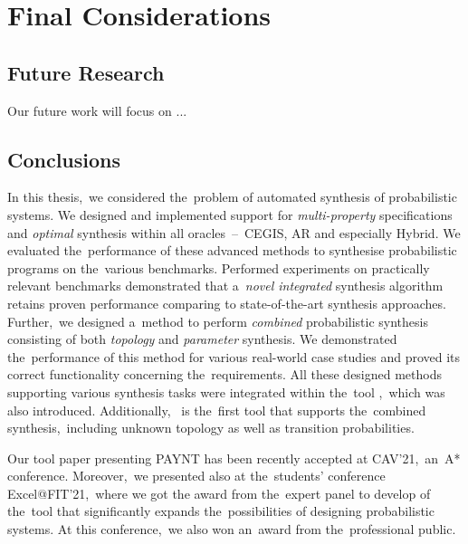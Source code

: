 \chapter{Final Considerations}\label{chap:conclusion}

\section{Future Research}
Our future work will focus on ...

\section{Conclusions}
In this thesis,~we considered the~problem of automated synthesis of probabilistic systems.
We designed and implemented support for \emph{multi-property} specifications and \emph{optimal} synthesis within all oracles \,--\, CEGIS, AR and especially Hybrid.
We evaluated the~performance of these advanced methods to synthesise probabilistic programs on the~various benchmarks.
Performed experiments on practically relevant benchmarks demonstrated that a~\textit{novel integrated} synthesis algorithm retains proven performance comparing to state-of-the-art synthesis approaches.
Further,~we designed a~method to perform \emph{combined} probabilistic synthesis consisting of both \emph{topology} and \emph{parameter} synthesis.
We demonstrated the~performance of this method for various real-world case studies and proved its correct functionality concerning the~requirements.
All these designed methods supporting various synthesis tasks were integrated within the~tool \toolname{},~which was also introduced.
Additionally,~\toolname{} is the~first tool that supports the~combined synthesis,~including unknown topology as well as transition probabilities.

Our tool paper presenting PAYNT has been recently accepted at CAV'21,~an~A* conference.
Moreover,~we presented \toolname{} also at the~students' conference Excel@FIT'21,~where we got the award from the~expert panel to develop of the~tool that significantly expands the~possibilities of designing probabilistic systems.
At this conference,~we also won an~award from the~professional public.

